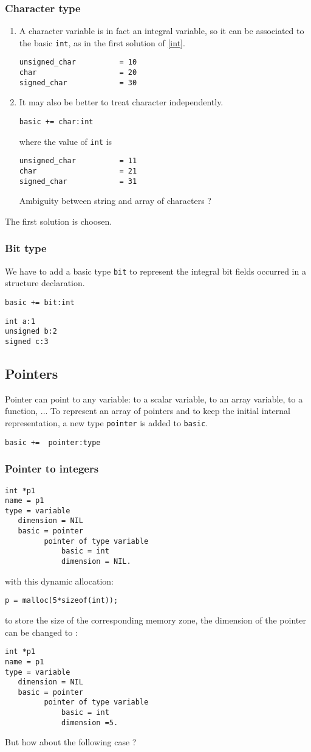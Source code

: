 \documentclass[a4paper]{article}
\begin{document}
\subsubsection{Character type} 
\begin{enumerate}
\item A character variable is in fact an integral variable, so it can be
associated to the basic \verb/int/, as in the first solution of \ref{int}.
\begin{verbatim}
unsigned_char          = 10
char                   = 20
signed_char            = 30
\end{verbatim}
\item 
It may also be better to treat character independently. 

\verb/basic += char:int/

where the value of \verb/int/ is 
\begin{verbatim}
unsigned_char          = 11
char                   = 21
signed_char            = 31
\end{verbatim}
Ambiguity between string and array of characters ?
\end{enumerate}
The first solution is choosen.
\subsubsection{Bit type}
We have to add a basic type \verb/bit/ to represent the integral bit fields
occurred in a structure declaration.   

\verb/basic += bit:int/
\begin{verbatim}
int a:1 
unsigned b:2 
signed c:3
\end{verbatim}
\subsection{Pointers}
Pointer can point to any variable: to a scalar variable, to an array variable, to a function, ...
To represent an array of pointers and to keep the initial internal representation, a new type \verb/pointer/ is
added to \verb/basic/.   

\verb/basic +=  pointer:type/

\subsubsection{Pointer to integers}
\begin{verbatim}
int *p1
name = p1
type = variable
   dimension = NIL
   basic = pointer
         pointer of type variable
             basic = int
             dimension = NIL.
\end{verbatim}
with this dynamic allocation:
\begin{verbatim}
p = malloc(5*sizeof(int));
\end{verbatim}
to store the size of the corresponding memory zone, the dimension of the
pointer can be changed to : 
\begin{verbatim}
int *p1
name = p1
type = variable
   dimension = NIL
   basic = pointer
         pointer of type variable
             basic = int
             dimension =5.
\end{verbatim}
But how about the following case ?
\end{document}
